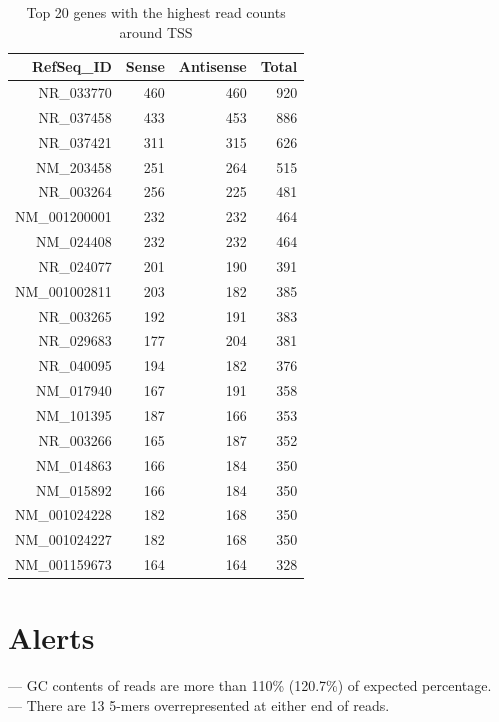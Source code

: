 \documentclass{article}
\begin{document}
{\scriptsize
\begin{longtable}{|r|r|r|r|}
\caption{Top 20 genes with the highest read counts around TSS} \\ 
  \hline
RefSeq\_ID & Sense & Antisense & Total \\ 
  \hline
NR\_033770 & 460 & 460 & 920 \\ 
   \rowcolor[gray]{0.9}NR\_037458 & 433 & 453 & 886 \\ 
  NR\_037421 & 311 & 315 & 626 \\ 
   \rowcolor[gray]{0.9}NM\_203458 & 251 & 264 & 515 \\ 
  NR\_003264 & 256 & 225 & 481 \\ 
   \rowcolor[gray]{0.9}NM\_001200001 & 232 & 232 & 464 \\ 
  NM\_024408 & 232 & 232 & 464 \\ 
   \rowcolor[gray]{0.9}NR\_024077 & 201 & 190 & 391 \\ 
  NM\_001002811 & 203 & 182 & 385 \\ 
   \rowcolor[gray]{0.9}NR\_003265 & 192 & 191 & 383 \\ 
  NR\_029683 & 177 & 204 & 381 \\ 
   \rowcolor[gray]{0.9}NR\_040095 & 194 & 182 & 376 \\ 
  NM\_017940 & 167 & 191 & 358 \\ 
   \rowcolor[gray]{0.9}NM\_101395 & 187 & 166 & 353 \\ 
  NR\_003266 & 165 & 187 & 352 \\ 
   \rowcolor[gray]{0.9}NM\_014863 & 166 & 184 & 350 \\ 
  NM\_015892 & 166 & 184 & 350 \\ 
   \rowcolor[gray]{0.9}NM\_001024228 & 182 & 168 & 350 \\ 
  NM\_001024227 & 182 & 168 & 350 \\ 
   \rowcolor[gray]{0.9}NM\_001159673 & 164 & 164 & 328 \\ 
   \hline
\hline
\end{longtable}
}\newpage

\section{Alerts}
 --- GC contents of reads are more than 110\% (120.7\%) of expected percentage. \\ 
  --- There are 13 5-mers overrepresented at either end of reads. \\ 
\end{document}

